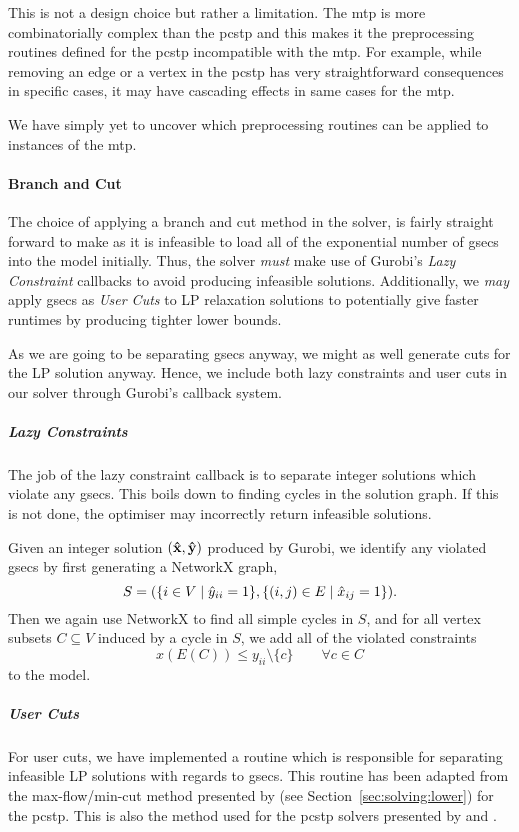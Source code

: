 This is not a design choice but rather a limitation. The \gls{mtp} is
more combinatorially
complex than the \gls{pcstp} and this makes it the preprocessing routines defined for
the \gls{pcstp} incompatible with the \gls{mtp}.
For example, while removing an edge or a vertex in the \gls{pcstp}
has very straightforward consequences in
specific cases, it may have cascading effects in same cases for the \gls{mtp}.

We have simply yet to uncover which preprocessing routines can be applied to instances of
the \gls{mtp}.

\paragraph{Branch and Cut}
The choice of applying a branch and cut method in the solver, is fairly straight
forward to make as it is infeasible to load all of the exponential number of
\glspl{gsec} into the model initially. Thus, the solver
\textit{must} make use of
Gurobi's \textit{Lazy Constraint} callbacks to avoid producing infeasible solutions.
Additionally, we \textit{may} apply \glspl{gsec} as
\textit{User Cuts} to LP relaxation solutions to potentially
give faster runtimes by producing tighter lower bounds.

As we are going to be separating \glspl{gsec} anyway, we might as well generate cuts
for the LP solution anyway. Hence, we include both lazy constraints and user cuts
in our solver through Gurobi's callback system.
\subparagraph{Lazy Constraints}
The job of the lazy constraint callback is to separate integer solutions
which violate any \glspl{gsec}. This boils down to finding cycles in the solution
graph. If this is not done, the optimiser may incorrectly return infeasible solutions.

Given an integer solution $(\mathbf{\hat{x}}, \mathbf{\hat{y}})$ produced by Gurobi, we
identify any violated \glspl{gsec} by first generating a NetworkX graph,
\[S = (\{i \in V \mid \hat y_{ii} = 1 \}, \{ (i, j) \in E \mid \hat x_{ij} = 1\})\mathnormal{.}\]
Then we again use NetworkX to find all simple cycles in $S$, and for all vertex
subsets $C \subseteq V$ induced by a cycle
in $S$, we add all of the violated constraints
\[x(E(C)) \leq y_{ii} \setminus \{c\} \qquad \forall c \in C\]
to the model.
\subparagraph{User Cuts}
For user cuts, we have implemented a routine which is
responsible for separating infeasible LP solutions with regards to \glspl{gsec}.
This routine has been adapted from the max-flow/min-cut method presented by \citet{lucena2004strong}
 (see Section~\ref{sec:solving:lower}) for the \gls{pcstp}.
 This is also the method used for the \gls{pcstp} solvers presented by
 \citet{ljubic2005solving} and \citet{gamrath2017scip}.

